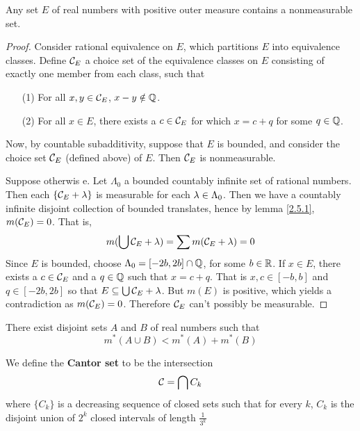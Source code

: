 \begin{theorem}\label{2.5.3}
    Any set $E$ of real numbers with positive outer measure contains a
    nonmeasurable set.
\end{theorem}
\begin{proof}
    Consider rational equivalence on $E$, which partitions $E$ into equivalence
    classes. Define  $\mathcal{C}_E$ a choice set of the equivalence classes on  $E$
    consisting of exactly one member from each class, such that
    \begin{enumerate}
        \item[(1)] For all $x,y \in \mathcal{C}_E$,  $x-y \notin \mathbb{Q}$.

        \item[(2)] For all $x \in E$, there exists a  $c \in \mathcal{C}_E$ for which
            $x=c+q$ for some  $q \in \mathbb{Q}$.
    \end{enumerate}

    Now, by countable subadditivity, suppose that $E$ is bounded, and consider
    the choice set  $\mathcal{C}_E$  (defined above) of $E$. Then  $\mathcal{C}_E$ is
    nonmeasurable.

    Suppose otherwis e. Let  $\Lambda_0$ a bounded countably infinite set of
    rational numbers. Then each $\{\mathcal{C}_E+\lambda\}$ is measurable for each $\lambda \in
    \Lambda_0$. Then we have a countably infinite disjoint collection of bounded
    translates, hence by lemma \ref{2.5.1}, $m(\mathcal{C}_E)=0$. That is,
    \begin{equation*}
        m(\bigcup{\mathcal{C}_E+\lambda})=\sum{m(\mathcal{C}_E+\lambda)}=0
    \end{equation*}
    Since $E$ is bounded, choose  $\Lambda_0=[-2b,2b] \cap \mathbb{Q}$, for some $b \in
    \mathbb{R}$. If  $x \in E$, there exists a  $c \in \mathcal{C}_E$ and a  $q \in \mathbb{Q}$ such
    that  $x=c+q$. That is $x,c \in [-b,b]$ and $q \in [-2b,2b]$ so that $E
    \subseteq \bigcup{\mathcal{C}_E+\lambda}$. But $m(E)$ is positive, which yields a
    contradiction as $m(\mathcal{C}_E)=0$. Therefore $\mathcal{C}_E$ can't possibly be
    measurable.
\end{proof}

\begin{theorem}\label{2.5.4}
    There exist disjoint sets $A$ and  $B$ of real numbers such that
    \begin{equation*}
        m^\ast(A \cup B)<m^\ast(A)+m^\ast(B)
    \end{equation*}
\end{theorem}

\begin{definition}
    We define the \textbf{Cantor set} to be the intersection
    \begin{equation*}
        \mathcal{C}=\bigcap{C_k}
    \end{equation*}
    where $\{C_k\}$ is a decreasing sequence of closed sets such that for every
    $k$,  $C_k$ is the disjoint union of  $2^k$ closed intervals of length
    $\frac{1}{3^k}$
\end{definition}

